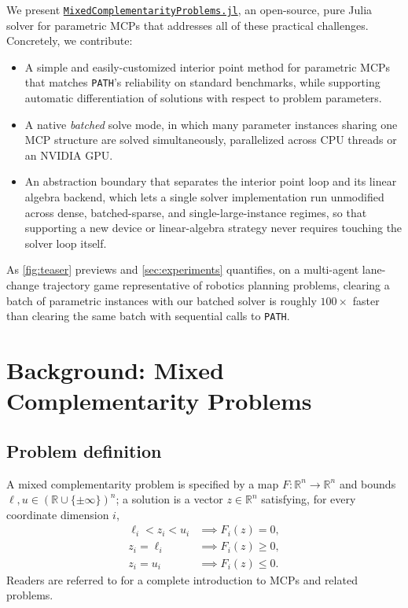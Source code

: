 \documentclass[conference]{IEEEtran}
\begin{document}
We present \href{https://github.com/CLeARoboticsLab/MixedComplementarityProblems.jl}{\texttt{MixedComplementarityProblems.jl}}, an open-source, pure Julia solver for parametric MCPs that addresses all of these practical challenges. Concretely, we contribute:
\begin{itemize}
  \item A simple and easily-customized interior point method for parametric MCPs that matches \texttt{PATH}'s
  reliability on standard benchmarks, while supporting automatic differentiation of solutions with respect to problem parameters.
  \item A native \emph{batched} solve mode, in which many parameter instances sharing
  one MCP structure are solved simultaneously, parallelized across CPU threads or an
  NVIDIA GPU.
  \item An abstraction boundary that separates the
    interior point loop and its linear algebra
  backend, which lets a single solver implementation run unmodified across dense,
  batched-sparse, and single-large-instance regimes, so that supporting a new device or
  linear-algebra strategy never requires touching the solver loop itself.
\end{itemize}

As \cref{fig:teaser} previews and \cref{sec:experiments} quantifies, on a
multi-agent lane-change trajectory game representative of robotics planning problems,
clearing a batch of parametric instances with our batched solver is roughly
$100\times$ faster than clearing the same batch with sequential calls to \texttt{PATH}.

\section{Background: Mixed Complementarity Problems}
\label{sec:background}

\subsection{Problem definition}
\label{sec:background:def}

A mixed complementarity problem is specified by a map $F:\mathbb{R}^n\to\mathbb{R}^n$
and bounds $\ell,u\in(\mathbb{R}\cup\{\pm\infty\})^n$; a solution is a vector
$z\in\mathbb{R}^n$ satisfying, for every coordinate dimension $i$,
\begin{equation}
  \begin{aligned}
    \ell_i < z_i < u_i &\implies F_i(z) = 0, \\
    z_i = \ell_i &\implies F_i(z) \ge 0, \\
    z_i = u_i &\implies F_i(z) \le 0.
  \end{aligned}
  \label{eq:mcp-box}
\end{equation}
Readers are referred to \cite{facchinei2003finite} for a complete introduction to MCPs and related problems.
\end{document}
